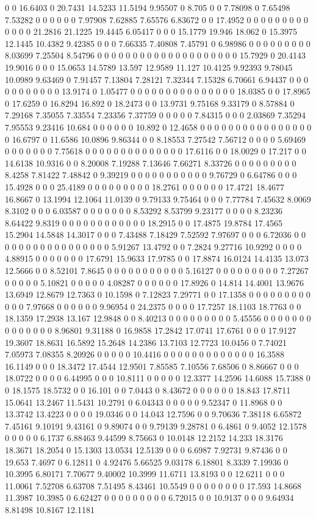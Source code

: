 0 0 16.6403 0 20.7431 14.5233 11.5194 9.95507 0 8.705 0 0 7.78098 0 7.65498 7.53282 0 0 0 0 0 0 7.97908 7.62885 7.65576 6.83672 0 0 17.4952 0 0 0 0 0 0 0 0 0 0 0 0 0 21.2816 21.1225 19.4445 6.05417 0 0 0 15.1779 19.946 18.062 0 15.3975 12.1445 10.4382 9.42385 0 0 0 7.66335 7.40808 7.45791 0 6.98986 0 0 0 0 0 0 0 0 0 8.03699 7.25504 8.54796 0 0 0 0 0 0 0 0 0 0 0 0 0 0 0 0 0 0 0 0 15.7929 0 20.4143 19.9016 0 0 0 15.0653 14.5789 13.597 12.9589 11.127 10.4125 9.92393 9.78045 10.0989 9.63469 0 7.91457 7.13804 7.28121 7.32344 7.15328 6.70661 6.94437 0 0 0 0 0 0 0 0 0 0 0 13.9174 0 1.05477 0 0 0 0 0 0 0 0 0 0 0 0 0 0 0 18.0385 0 0 17.8965 0 17.6259 0 16.8294 16.892 0 18.2473 0 0 13.9731 9.75168 9.33179 0 8.57884 0 7.29168 7.35055 7.33554 7.23356 7.37759 0 0 0 0 0 7.84315 0 0 0 2.03869 7.35294 7.95553 9.23416 10.684 0 0 0 0 0 0 10.892 0 12.4658 0 0 0 0 0 0 0 0 0 0 0 0 0 0 0 0 0 16.6797 0 11.6586 10.0896 9.86344 0 0 8.18553 7.27542 7.56712 0 0 0 0 5.69469 0 0 0 0 0 0 0 7.75618 0 0 0 0 0 0 0 0 0 0 0 0 0 0 17.6116 0 0 18.0029 0 17.217 0 0 14.6138 10.9316 0 0 8.20008 7.19288 7.13646 7.66271 8.33726 0 0 0 0 0 0 0 0 0 8.4258 7.81422 7.48842 0 9.39219 0 0 0 0 0 0 0 0 0 0 0 9.76729 0 6.64786 0 0 0 15.4928 0 0 0 25.4189 0 0 0 0 0 0 0 0 0 18.2761 0 0 0 0 0 0 17.4721 18.4677 16.8667 0 13.1994 12.1064 11.0139 0 9.79133 9.75464 0 0 0 7.77784 7.45632 8.0069 8.3102 0 0 0 6.03587 0 0 0 0 0 0 0 8.53292 8.53799 9.23177 0 0 0 0 8.23236 8.64422 9.8319 0 0 0 0 0 0 0 0 0 0 0 0 18.2915 0 0 17.4875 19.8784 17.4565 15.2904 14.5848 14.3017 0 0 0 7.43488 7.18429 7.52592 7.97697 0 0 0 6.72036 0 0 0 0 0 0 0 0 0 0 0 0 0 0 0 0 0 5.91267 13.4792 0 0 7.2824 9.27716 10.9292 0 0 0 0 4.88915 0 0 0 0 0 0 0 17.6791 15.9633 17.9785 0 0 17.8874 16.0124 14.4135 13.073 12.5666 0 0 8.52101 7.8645 0 0 0 0 0 0 0 0 0 0 0 5.16127 0 0 0 0 0 0 0 0 0 7.27267 0 0 0 0 0 5.10821 0 0 0 0 0 4.08287 0 0 0 0 0 0 17.8926 0 14.814 14.4001 13.9676 13.6949 12.8679 12.7363 0 10.1598 0 7.12823 7.29771 0 0 17.1358 0 0 0 0 0 0 0 0 0 0 0 0 7.97668 0 0 0 0 0 0 9.96954 0 24.2375 0 0 0 0 17.7257 18.1103 18.7763 0 0 18.1359 17.2938 13.167 12.9848 0 0 8.40213 0 0 0 0 0 0 0 0 0 5.45556 0 0 0 0 0 0 0 0 0 0 0 0 0 0 8.96801 9.31188 0 16.9858 17.2842 17.0741 17.6761 0 0 0 17.9127 19.3607 18.8631 16.5892 15.2648 14.2386 13.7103 12.7723 10.0456 0 7.74021 7.05973 7.08355 8.20926 0 0 0 0 0 10.4416 0 0 0 0 0 0 0 0 0 0 0 0 0 16.3588 16.1149 0 0 0 18.3472 17.4544 12.9501 7.85585 7.10556 7.68506 0 8.86667 0 0 0 18.0722 0 0 0 0 6.44995 0 0 0 10.8111 0 0 0 0 0 12.3377 14.2596 14.6088 15.7388 0 0 18.1575 18.5732 0 0 16.101 0 0 7.0443 0 8.43672 0 0 0 0 0 0 18.843 17.8711 15.0641 13.2467 11.5431 10.2791 0 6.04343 0 0 0 0 0 9.52347 0 11.8968 0 0 13.3742 13.4223 0 0 0 0 19.0346 0 0 14.043 12.7596 0 0 9.70636 7.38118 6.65872 7.45161 9.10191 9.43161 0 9.89074 0 0 9.79139 9.28781 0 6.4861 0 9.4052 12.1578 0 0 0 0 0 6.1737 6.88463 9.44599 8.75663 0 10.0148 12.2152 14.233 18.3176 18.3671 18.2054 0 15.1303 13.0534 12.5139 0 0 0 6.6987 7.92731 9.87436 0 0 19.653 7.4697 0 6.12811 0 4.92476 5.66525 9.03178 6.18801 8.3339 7.19936 0 10.3995 6.80171 7.70677 9.40002 10.3999 11.6711 13.8193 0 0 12.6211 0 0 0 11.0061 7.52708 6.63708 7.51495 8.43461 10.5549 0 0 0 0 0 0 0 0 17.593 14.8668 11.3987 10.3985 0 6.62427 0 0 0 0 0 0 0 0 0 6.72015 0 0 10.9137 0 0 0 9.64934 8.81498 10.8167 12.1181 